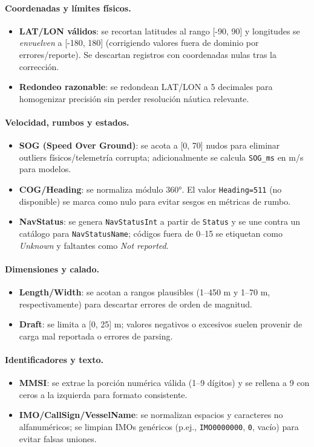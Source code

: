 \documentclass[10pt]{article}
\begin{document}
\paragraph{Coordenadas y límites físicos.}
\begin{itemize}
  \item \textbf{LAT/LON válidos}: se recortan latitudes al rango [-90, 90] y longitudes se \emph{envuelven} a [-180, 180] (corrigiendo valores fuera de dominio por errores/reporte). Se descartan registros con coordenadas nulas tras la corrección.
  \item \textbf{Redondeo razonable}: se redondean LAT/LON a 5 decimales para homogenizar precisión sin perder resolución náutica relevante.
\end{itemize}

\paragraph{Velocidad, rumbos y estados.}
\begin{itemize}
  \item \textbf{SOG (Speed Over Ground)}: se acota a [0, 70] nudos para eliminar outliers físicos/telemetría corrupta; adicionalmente se calcula \texttt{SOG\_ms} en m/s para modelos.
  \item \textbf{COG/Heading}: se normaliza módulo 360°. El valor \texttt{Heading=511} (no disponible) se marca como nulo para evitar sesgos en métricas de rumbo.
  \item \textbf{NavStatus}: se genera \texttt{NavStatusInt} a partir de \texttt{Status} y se une contra un catálogo para \texttt{NavStatusName}; códigos fuera de 0–15 se etiquetan como \textit{Unknown} y faltantes como \textit{Not reported}.
\end{itemize}

\paragraph{Dimensiones y calado.}
\begin{itemize}
  \item \textbf{Length/Width}: se acotan a rangos plausibles (1–450 m y 1–70 m, respectivamente) para descartar errores de orden de magnitud.
  \item \textbf{Draft}: se limita a [0, 25] m; valores negativos o excesivos suelen provenir de carga mal reportada o errores de parsing.
\end{itemize}

\paragraph{Identificadores y texto.}
\begin{itemize}
  \item \textbf{MMSI}: se extrae la porción numérica válida (1–9 dígitos) y se rellena a 9 con ceros a la izquierda para formato consistente.
  \item \textbf{IMO/CallSign/VesselName}: se normalizan espacios y caracteres no alfanuméricos; se limpian IMOs genéricos (p.ej., \texttt{IMO0000000}, \texttt{0}, vacío) para evitar falsas uniones.
\end{itemize}
\end{document}
